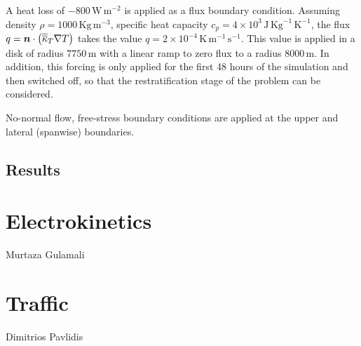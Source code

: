 A heat loss of $-800\,\mathrm{W}\,\mathrm{m}^{-2}$ is
applied as a flux boundary condition. Assuming density $\rho=1000\,\mathrm{Kg}\,\mathrm{m}^{-3}$,
specific heat capacity $c_p=4\times 10^3\,\mathrm{J}\,\mathrm{Kg}^{-1}\,\mathrm{K}^{-1}$,
the flux $q={\mbox{\boldmath$n$}}\cdot\left ( \overline{\overline{\kappa}}_T  \nabla T\right)$
takes the value $q = 2\times 10^{-4}\,\mathrm{K}\,\mathrm{m}^{-1}\,\mathrm{s}^{-1}$.
This value is applied in a disk of radius $7750\,\mathrm{m}$ with a linear ramp to zero flux to a radius
$8000\,\mathrm{m}$. In addition, this forcing is only applied for the first 48 hours of the simulation and
then switched off, so that the restratification stage of the problem can be considered.



No-normal flow, free-stress boundary conditions are applied at the upper and lateral
(spanwise) boundaries.


\subsection{Results}





\section{Electrokinetics}
\label{sect:electrokinetics}

Murtaza Gulamali


\section{Traffic}
\label{sect:traffic_eg}

Dimitrios Pavlidis









